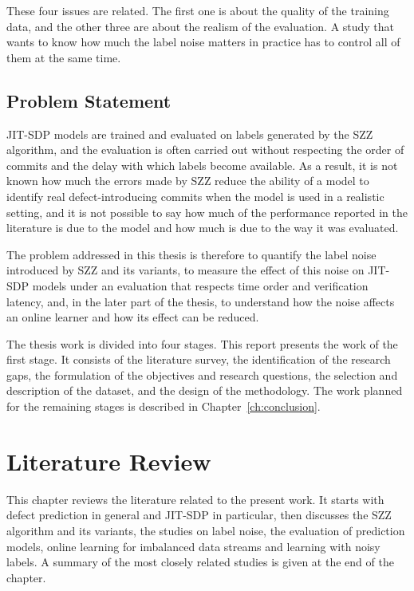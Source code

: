 \documentclass[12pt,a4paper,oneside]{report}
\begin{document}
These four issues are related. The first one is about the quality of the
training data, and the other three are about the realism of the evaluation.
A study that wants to know how much the label noise matters in practice has to
control all of them at the same time.

\section{Problem Statement}

JIT-SDP models are trained and evaluated on labels generated by the SZZ
algorithm, and the evaluation is often carried out without respecting the
order of commits and the delay with which labels become available. As a
result, it is not known how much the errors made by SZZ reduce the ability of
a model to identify real defect-introducing commits when the model is used in
a realistic setting, and it is not possible to say how much of the performance
reported in the literature is due to the model and how much is due to the way
it was evaluated.

The problem addressed in this thesis is therefore to quantify the label noise
introduced by SZZ and its variants, to measure the effect of this noise on
JIT-SDP models under an evaluation that respects time order and verification
latency, and, in the later part of the thesis, to understand how the noise
affects an online learner and how its effect can be reduced.

The thesis work is divided into four stages. This report presents the work of
the first stage. It consists of the literature survey, the
identification of the research gaps, the formulation of the objectives and
research questions, the selection and description of the dataset, and the
design of the methodology. The work planned for the remaining stages is
described in Chapter~\ref{ch:conclusion}.

\chapter{Literature Review}\label{ch:lit}

This chapter reviews the literature related to the present work. It starts
with defect prediction in general and JIT-SDP in particular, then discusses
the SZZ algorithm and its variants, the studies on label noise, the evaluation
of prediction models, online learning for imbalanced data streams and learning
with noisy labels. A summary of the most closely related studies is given at
the end of the chapter.
\end{document}
